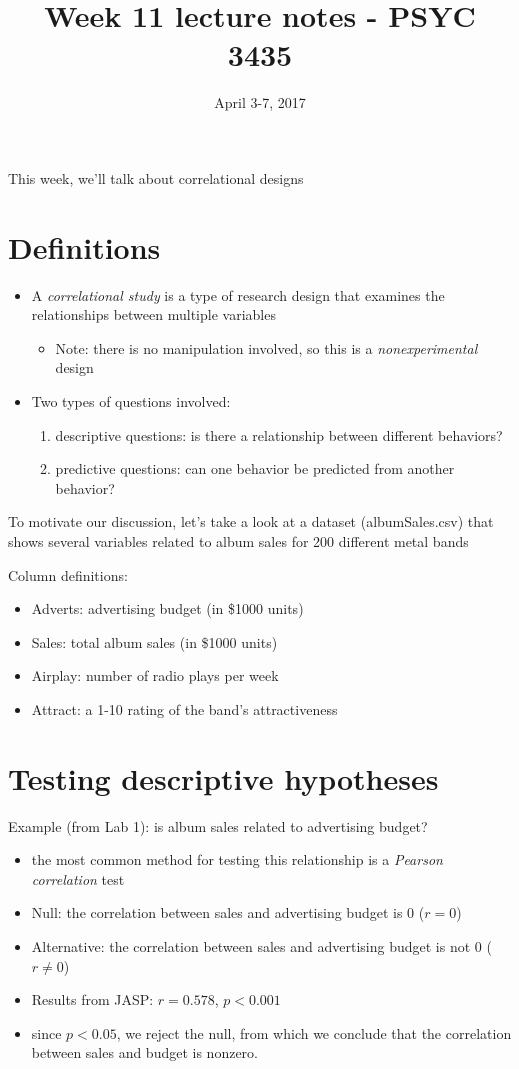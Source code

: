 \documentclass[11pt]{article}
\date{April 3-7, 2017}
\title{Week 11 lecture notes - PSYC 3435}
\begin{document}
\maketitle
This week, we'll talk about correlational designs

\section*{Definitions}
\label{sec-1}
\begin{itemize}
\item A \emph{correlational study} is a type of research design that examines the relationships between multiple variables
\begin{itemize}
\item Note: there is no manipulation involved, so this is a \emph{nonexperimental} design
\end{itemize}

\item Two types of questions involved:
\begin{enumerate}
\item descriptive questions: is there a relationship between different behaviors?
\item predictive questions: can one behavior be predicted from another behavior?
\end{enumerate}
\end{itemize}

To motivate our discussion, let's take a look at a dataset (albumSales.csv) that shows several variables related to album sales for 200 different metal bands

Column definitions:
\begin{itemize}
\item Adverts: advertising budget (in \$1000 units)
\item Sales: total album sales (in \$1000 units)
\item Airplay: number of radio plays per week
\item Attract: a 1-10 rating of the band's attractiveness
\end{itemize}


\section*{Testing descriptive hypotheses}
\label{sec-2}

Example (from Lab 1): is album sales related to advertising budget?
\begin{itemize}
\item the most common method for testing this relationship is a \emph{Pearson correlation} test
\item Null: the correlation between sales and advertising budget is 0 ($r=0$)
\item Alternative: the correlation between sales and advertising budget is not 0 ($r\neq 0$)
\item Results from JASP: $r = 0.578$, $p < 0.001$
\item since $p<0.05$, we reject the null, from which we conclude that the correlation between sales and budget is nonzero.
\end{itemize}
\end{document}
